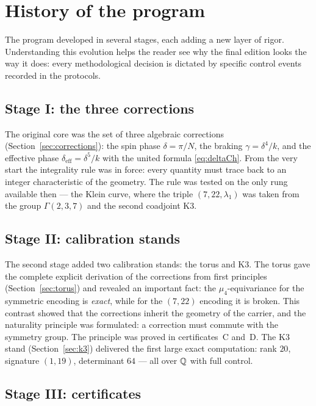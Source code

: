 \section{History of the program}\label{sec:history}

The program developed in several stages, each adding a new layer of
rigor. Understanding this evolution helps the reader see why the
final edition looks the way it does: every methodological decision
is dictated by specific control events recorded in the protocols.

\subsection{Stage I: the three corrections}

The original core was the set of three algebraic corrections
(Section~\ref{sec:corrections}): the spin phase $\delta=\pi/N$, the
braking $\gamma=\delta^4/k$, and the effective phase
$\delta_{\mathrm{eff}}=\delta^5/k$ with the united formula
\eqref{eq:deltaCh}. From the very start the integrality rule was in
force: every quantity must trace back to an integer characteristic
of the geometry. The rule was tested on the only rung available then
--- the Klein curve, where the triple $(7,22,\lambda_1)$ was taken
from the group $\Gamma(2,3,7)$ and the second coadjoint K3.

\subsection{Stage II: calibration stands}

The second stage added two calibration stands: the torus and K3. The
torus gave the complete explicit derivation of the corrections from
first principles (Section~\ref{sec:torus}) and revealed an important
fact: the $\mu_4$-equivariance for the symmetric encoding is
\emph{exact}, while for the $(7,22)$ encoding it is broken. This
contrast showed that the corrections inherit the geometry of the
carrier, and the naturality principle was formulated: a correction
must commute with the symmetry group. The principle was proved in
certificates~C and~D. The K3 stand (Section~\ref{sec:k3}) delivered
the first large exact computation: rank $20$, signature $(1,19)$,
determinant $64$ --- all over $\mathbb{Q}$ with full control.

\subsection{Stage III: certificates}

